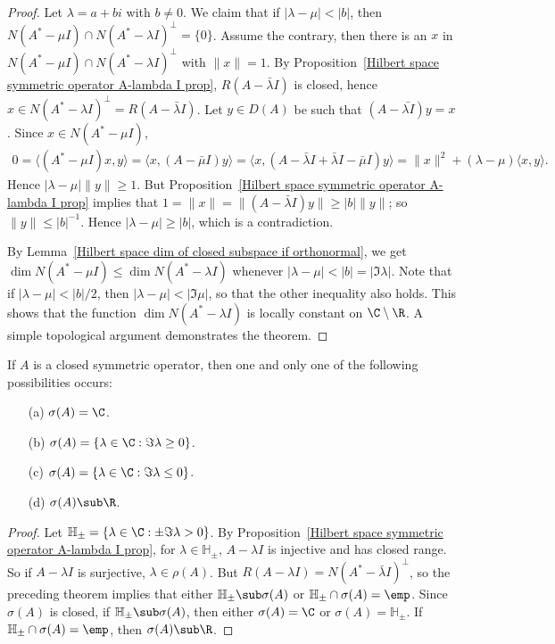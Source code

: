 \begin{proof}
Let $\lambda=a+bi$ with $b\neq 0$. We claim that if $|\lambda-\mu|<|b|$, then $N(A^*-\mu I)\cap N(A^*-\lambda I)^\bot=\{0\}$. Assume the contrary, then there is an $x$ in $N(A^*-\mu I)\cap N(A^*-\lambda I)^\bot$ with $\|x\|=1$. By Proposition~\ref{Hilbert space symmetric operator A-lambda I prop}, $R(A-\bar{\lambda}I)$ is closed, hence $x\in N(A^*-\lambda I)^\bot=R(A-\bar{\lambda}I)$. Let $y\in D(A)$ be such that $(A-\bar{\lambda I})y=x$. Since $x\in N(A^*-\mu I)$,
\begin{align*}
0=\langle(A^*-\mu I)x,y\rangle=\langle x,(A-\bar{\mu}I)y\rangle=\langle x,(A-\bar{\lambda}I+\bar{\lambda}I-\bar{\mu}I)y\rangle=\|x\|^2+(\lambda-\mu)\langle x,y\rangle.
\end{align*}
Hence $|\lambda-\mu|\|y\|\geq 1$. But Proposition~\ref{Hilbert space symmetric operator A-lambda I prop} implies that $1=\|x\|=\|(A-\bar{\lambda}I)y\|\geq|b|\|y\|$; so $\|y\|\leq|b|^{-1}$. Hence $|\lambda-\mu|\geq|b|$, which is a contradiction.\par
By Lemma~\ref{Hilbert space dim of closed subspace if orthonormal}, we get $\dim N(A^*-\mu I)\leq\dim N(A^*-\lambda I)$ whenever $|\lambda-\mu|<|b|=|\Im\lambda|$. Note that if $|\lambda-\mu|<|b|/2$, then $|\lambda-\mu|<|\Im\mu|$, so that the other inequality also holds. This shows that the function $\dim N(A^*-\lambda I)$ is locally constant on $\C\setminus\R$. A simple topological argument demonstrates the theorem. 
\end{proof}
\begin{theorem}\label{Hilbert space closed symmetric operator spectrum char}
If $A$ is a closed symmetric operator, then one and only one of the following possibilities occurs:
\begin{itemize}
\item[(a)] $\sigma(A)=\C$.
\item[(b)] $\sigma(A)=\{\lambda\in\C:\Im\lambda\geq 0\}$.
\item[(c)] $\sigma(A)=\{\lambda\in\C:\Im\lambda\leq 0\}$.
\item[(d)] $\sigma(A)\sub\R$. 
\end{itemize}
\end{theorem}
\begin{proof}
Let $\mathbb{H}_{\pm}=\{\lambda\in\C:\pm\Im\lambda>0\}$. By Proposition~\ref{Hilbert space symmetric operator A-lambda I prop}, for $\lambda\in\mathbb{H}_{\pm}$, $A-\lambda I$ is injective and has closed range. So if $A-\lambda I$ is surjective, $\lambda\in\rho(A)$. But $R(A-\lambda I)=N(A^*-\bar{\lambda}I)^\bot$, so the preceding theorem implies that either $\mathbb{H}_{\pm}\sub\sigma(A)$ or $\mathbb{H}_{\pm}\cap\sigma(A)=\emp$. Since $\sigma(A)$ is closed, if $\mathbb{H}_{\pm}\sub\sigma(A)$, then either $\sigma(A)=\C$ or $\sigma(A)=\mathbb{H}_{\pm}$. If $\mathbb{H}_{\pm}\cap\sigma(A)=\emp$, then $\sigma(A)\sub\R$.
\end{proof}
